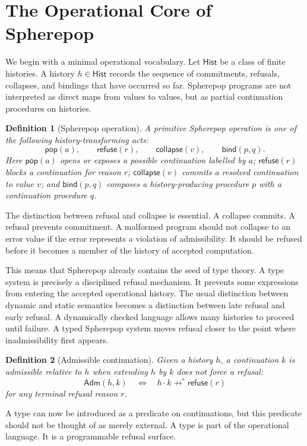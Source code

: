 \documentclass[12pt,oneside]{article}
\newtheorem{definition}{Definition}[section]
\newcommand{\Pop}{\mathsf{pop}}
\newcommand{\Refuse}{\mathsf{refuse}}
\newcommand{\Collapse}{\mathsf{collapse}}
\newcommand{\Bind}{\mathsf{bind}}
\newcommand{\Hist}{\mathsf{Hist}}
\newcommand{\Adm}{\mathsf{Adm}}
\newcommand{\steps}{\longrightarrow^{*}}
\begin{document}
\section{The Operational Core of Spherepop}

We begin with a minimal operational vocabulary. Let $\Hist$ be a class of finite histories. A history $h \in \Hist$ records the sequence of commitments, refusals, collapses, and bindings that have occurred so far. Spherepop programs are not interpreted as direct maps from values to values, but as partial continuation procedures on histories.

\begin{definition}[Spherepop operation]
A primitive Spherepop operation is one of the following history-transforming acts:
\[
\Pop(a), \qquad \Refuse(r), \qquad \Collapse(v), \qquad \Bind(p,q).
\]
Here $\Pop(a)$ opens or exposes a possible continuation labelled by $a$; $\Refuse(r)$ blocks a continuation for reason $r$; $\Collapse(v)$ commits a resolved continuation to value $v$; and $\Bind(p,q)$ composes a history-producing procedure $p$ with a continuation procedure $q$.
\end{definition}

The distinction between refusal and collapse is essential. A collapse commits. A refusal prevents commitment. A malformed program should not collapse to an error value if the error represents a violation of admissibility. It should be refused before it becomes a member of the history of accepted computation.

This means that Spherepop already contains the seed of type theory. A type system is precisely a disciplined refusal mechanism. It prevents some expressions from entering the accepted operational history. The usual distinction between dynamic and static semantics becomes a distinction between late refusal and early refusal. A dynamically checked language allows many histories to proceed until failure. A typed Spherepop system moves refusal closer to the point where inadmissibility first appears.

\begin{definition}[Admissible continuation]
Given a history $h$, a continuation $k$ is admissible relative to $h$ when extending $h$ by $k$ does not force a refusal:
\[
\Adm(h,k) \quad \Longleftrightarrow \quad h \cdot k \not\steps \Refuse(r)
\]
for any terminal refusal reason $r$.
\end{definition}

A type can now be introduced as a predicate on continuations, but this predicate should not be thought of as merely external. A type is part of the operational language. It is a programmable refusal surface.
\end{document}
